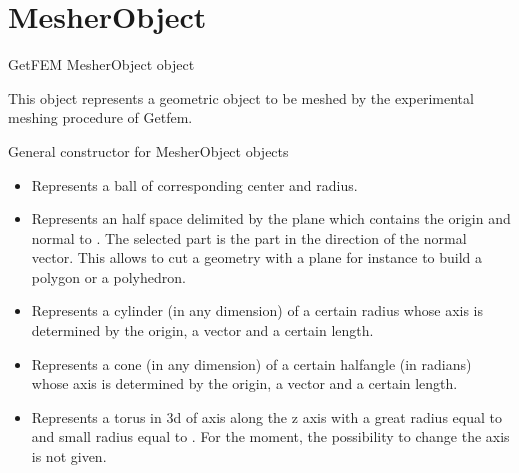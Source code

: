 \documentclass[a4paper,11pt,english]{sphinxmanual}
\begin{document}
\section{MesherObject}
\label{\detokenize{python/cmdref_MesherObject:mesherobject}}\label{\detokenize{python/cmdref_MesherObject::doc}}

\begin{fulllineitems}
\label{\detokenize{python/cmdref_MesherObject:getfem.MesherObject}}
GetFEM MesherObject object

This object represents a geometric object to be meshed by the
experimental meshing procedure of Getfem.

General constructor for MesherObject objects
\begin{itemize}
\item {} 
Represents a ball of corresponding center and radius.

\item {} 
Represents an half space delimited by the plane which contains the
origin and normal to . The selected part is the part
in the direction of the normal vector. This allows to cut a geometry
with a plane for instance to build a polygon or a polyhedron.

\item {} 
Represents a cylinder (in any dimension) of a certain radius whose axis
is determined by the origin, a vector  and a certain length.

\item {} 
Represents a cone (in any dimension) of a certain half\sphinxhyphen{}angle (in radians)
whose axis is determined by the origin, a vector  and a certain length.

\item {} 
Represents a torus in 3d of axis along the z axis with a great radius
equal to  and small radius equal to . For the moment, the
possibility to change the axis is not given.


\end{itemize}
\end{fulllineitems}
\end{document}
